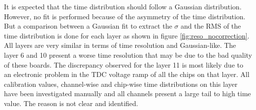 It is expected that the time distribution should follow a Gaussian distribution. However, no fit is performed because of the asymmetry of the time distribution. But a comparison between a Gaussian fit to extract the $\sigma$ and the RMS of the time distribution is done for each layer as shown in figure \ref{fig:reso_nocorrection}. All layers are very similar in terms of time resolution and Gaussian-like. The layer 6 and 10 present a worse time resolution that may be due to the bad quality of these boards. The discrepancy observed for the layer 11 is most likely due to an electronic problem in the TDC voltage ramp of all the chips on that layer. All calibration values, channel-wise and chip-wise time distributions on this layer have been investigated manually and all channels present a large tail to high time value. The reason is not clear and identified.

